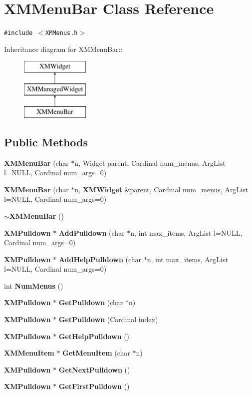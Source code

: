 \section{XMMenu\-Bar  Class Reference}
\label{classXMMenuBar}
{\tt \#include $<$XMMenus.h$>$}

Inheritance diagram for XMMenu\-Bar::\begin{figure}[H]
\begin{center}
\leavevmode
\includegraphics[height=3cm]{classXMMenuBar}
\end{center}
\end{figure}
\subsection*{Public Methods}
\begin{CompactItemize}
\item 
{\bf XMMenu\-Bar} (char $\ast$n, Widget parent, Cardinal num\_\-menus, Arg\-List l=NULL, Cardinal num\_\-args=0)
\item 
{\bf XMMenu\-Bar} (char $\ast$n, {\bf XMWidget} \&parent, Cardinal num\_\-menus, Arg\-List l=NULL, Cardinal num\_\-args=0)
\item 
{\bf $\sim$XMMenu\-Bar} ()
\item 
{\bf XMPulldown} $\ast$ {\bf Add\-Pulldown} (char $\ast$n, int max\_\-items, Arg\-List l=NULL, Cardinal num\_\-args=0)
\item 
{\bf XMPulldown} $\ast$ {\bf Add\-Help\-Pulldown} (char $\ast$n, int max\_\-items, Arg\-List l=NULL, Cardinal num\_\-args=0)
\item 
int {\bf Num\-Menus} ()
\item 
{\bf XMPulldown} $\ast$ {\bf Get\-Pulldown} (char $\ast$n)
\item 
{\bf XMPulldown} $\ast$ {\bf Get\-Pulldown} (Cardinal index)
\item 
{\bf XMPulldown} $\ast$ {\bf Get\-Help\-Pulldown} ()
\item 
{\bf XMMenu\-Item} $\ast$ {\bf Get\-Menu\-Item} (char $\ast$n)
\item 
{\bf XMPulldown} $\ast$ {\bf Get\-Next\-Pulldown} ()
\item 
{\bf XMPulldown} $\ast$ {\bf Get\-First\-Pulldown} ()
\end{CompactItemize}
